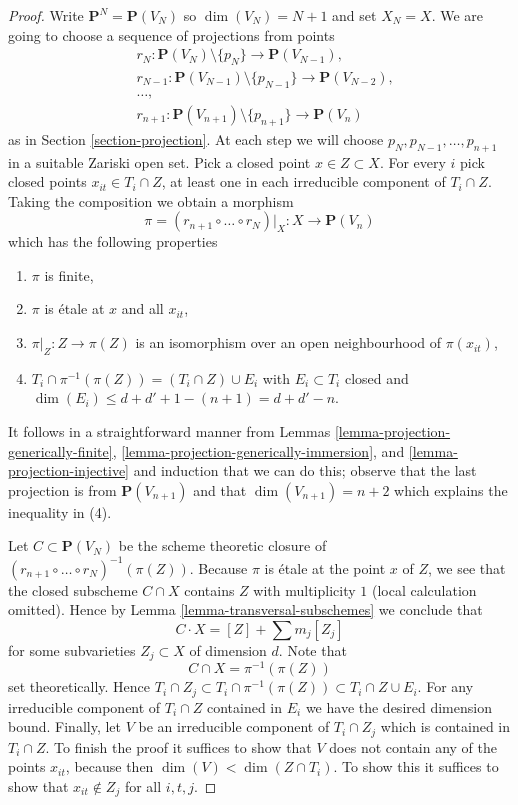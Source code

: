 \begin{proof}
Write $\mathbf{P}^N = \mathbf{P}(V_N)$ so $\dim(V_N) = N + 1$ and set
$X_N = X$. We are going to choose a sequence of projections from points
\begin{align*}
& r_N : 
\mathbf{P}(V_N) \setminus \{p_N\} \to \mathbf{P}(V_{N - 1}), \\
& r_{N - 1} :
\mathbf{P}(V_{N - 1}) \setminus \{p_{N - 1}\} \to \mathbf{P}(V_{N - 2}), \\
& \ldots,\\
& r_{n + 1} :
\mathbf{P}(V_{n + 1}) \setminus \{p_{n + 1}\} \to \mathbf{P}(V_n)
\end{align*}
as in Section \ref{section-projection}. At each step we will choose
$p_N, p_{N - 1}, \ldots, p_{n + 1}$ in a suitable Zariski open set.
Pick a closed point $x \in Z \subset X$. For every $i$ pick
closed points $x_{it} \in T_i \cap Z$, at least one in each irreducible
component of $T_i \cap Z$. Taking the composition we obtain
a morphism
$$
\pi = (r_{n + 1} \circ \ldots \circ r_N)|_X :
X \longrightarrow \mathbf{P}(V_n)
$$
which has the following properties
\begin{enumerate}
\item $\pi$ is finite,
\item $\pi$ is \'etale at $x$ and all $x_{it}$,
\item $\pi|_Z : Z \to \pi(Z)$ is an isomorphism
over an open neighbourhood of $\pi(x_{it})$,
\item $T_i \cap \pi^{-1}(\pi(Z)) = (T_i \cap Z) \cup E_i$ with
$E_i \subset T_i$ closed and
$\dim(E_i) \leq d + d' + 1 - (n + 1) = d + d' - n$.
\end{enumerate}
It follows in a straightforward manner from
Lemmas \ref{lemma-projection-generically-finite},
\ref{lemma-projection-generically-immersion}, and
\ref{lemma-projection-injective} and induction that we can do this;
observe that the last projection is from $\mathbf{P}(V_{n + 1})$ and that
$\dim(V_{n + 1}) = n + 2$ which explains the inequality in (4).

\medskip\noindent
Let $C \subset \mathbf{P}(V_N)$ be the scheme theoretic closure of
$(r_{n + 1} \circ \ldots \circ r_N)^{-1}(\pi(Z))$. Because $\pi$
is \'etale at the point $x$ of $Z$, we see that the closed subscheme
$C \cap X$ contains $Z$ with multiplicity $1$ (local calculation omitted).
Hence by Lemma \ref{lemma-transversal-subschemes} we conclude that
$$
C \cdot X = [Z] + \sum m_j[Z_j]
$$
for some subvarieties $Z_j \subset X$ of dimension $d$. Note that
$$
C \cap X = \pi^{-1}(\pi(Z))
$$
set theoretically. Hence
$T_i \cap Z_j \subset T_i \cap \pi^{-1}(\pi(Z)) \subset T_i \cap Z \cup E_i$.
For any irreducible component of $T_i \cap Z$ contained in $E_i$ we
have the desired dimension bound. Finally, let $V$ be an irreducible
component of $T_i \cap Z_j$ which is contained in $T_i \cap Z$. To finish
the proof it suffices to show that $V$ does not contain any of the
points $x_{it}$, because then $\dim(V) < \dim(Z \cap T_i)$.
To show this it suffices to show that $x_{it} \not \in Z_j$
for all $i, t, j$.


\end{proof}
